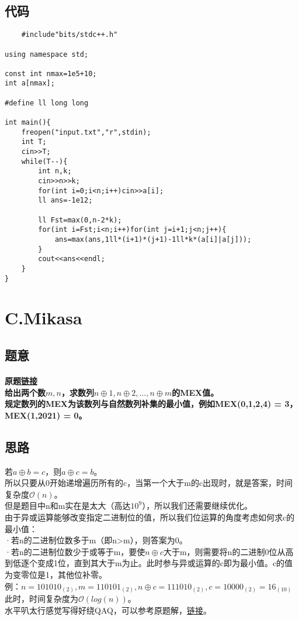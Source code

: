 \documentclass[cyan,pad,cn]{elegantnote}
\begin{document}
\subsection{代码}
\begin{lstlisting}
    #include"bits/stdc++.h"

using namespace std;

const int nmax=1e5+10;
int a[nmax];

#define ll long long

int main(){
    freopen("input.txt","r",stdin);
    int T;
    cin>>T;
    while(T--){
        int n,k;
        cin>>n>>k;
        for(int i=0;i<n;i++)cin>>a[i];
        ll ans=-1e12;

        ll Fst=max(0,n-2*k);
        for(int i=Fst;i<n;i++)for(int j=i+1;j<n;j++){
            ans=max(ans,1ll*(i+1)*(j+1)-1ll*k*(a[i]|a[j]));
        }
        cout<<ans<<endl;
    }
}
\end{lstlisting}

\section{
    C.Mikasa
}

\subsection{题意}
\paragraph{
    原题\href{http://codeforces.com/contest/1554/problem/C}{链接}\\
    给出两个数\(m,n\)，求数列\(n\oplus 1,n\oplus 2,...,n\oplus m\)的MEX值。\\
    规定数列的MEX为该数列与自然数列补集的最小值，例如MEX(0,1,2,4) = 3，MEX(1,2021) = 0。
}

\subsection{思路}
\begin{paragraph}
    若\(a\oplus b=c\)，则\(a\oplus c=b\)。\\
    所以只要从0开始递增遍历所有的c，当第一个大于m的c出现时，就是答案，时间复杂度\(\mathcal{O}(n)\)。\\
    但是题目中n和m实在是太大（高达\(10^9\)），所以我们还需要继续优化。\\
    由于异或运算能够改变指定二进制位的值，所以我们位运算的角度考虑如何求c的最小值：\\
    ·若n的二进制位数多于m（即n>m），则答案为0。\\
    ·若n的二进制位数少于或等于m，要使\(n\oplus c\)大于m，则需要将n的二进制0位从高到低逐个变成1位，直到其大于m为止。此时参与异或运算的c即为最小值。c的值为变零位是1，其他位补零。\\
    例：\(n=101010_{(2)},m=110101_{(2)},n\oplus c=111010_{(2)},c=10000_{(2)}=16_{(10)}\)\\
    此时，时间复杂度为\(\mathcal{O}(log(n))\)。\\
    水平叭太行感觉写得好绕QAQ，可以参考原题解，\href{http://codeforces.com/blog/entry/93321}{链接}。
\end{paragraph}
\end{document}
